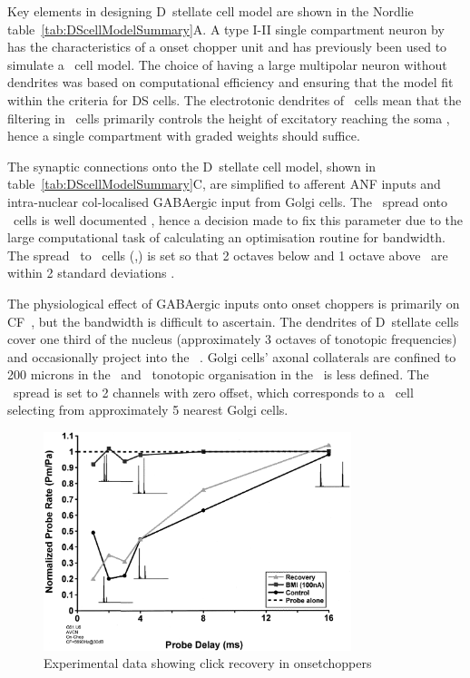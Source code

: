 Key elements in designing D~stellate cell model are shown in the Nordlie table~\ref{tab:DScellModelSummary}A.
A type I-II single compartment neuron by \citet{RothmanManis:2003b} has the characteristics of a onset chopper unit and has previously been used to simulate a \DS~cell model.
The choice of having a large multipolar neuron without dendrites was based on computational efficiency and ensuring that the model fit within the criteria for DS cells.
The electrotonic dendrites of \DS~cells mean that the filtering in \DS~cells primarily controls the height of excitatory {\PSPs} reaching the soma \citep{WhiteYoungEtAl:1994}, hence a single compartment with graded weights should suffice.


The synaptic connections onto the D~stellate cell model, shown in table~\ref{tab:DScellModelSummary}C, are simplified to afferent ANF inputs and intra-nuclear col-localised GABAergic input from Golgi cells.
The \ANF~spread onto \DS~cells is well documented \citep{PaoliniClark:1999,ArnottWallaceEtAl:2004,PalmerWallaceEtAl:2003,JiangPalmerEtAl:1996,PalmerJiangEtAl:1996}, hence a decision made to fix this parameter due to the large computational task of calculating an optimisation routine for \ANFDS bandwidth.
The spread \ANF~to \DS~cells (\sANFDSh,\sANFDSl) is set so that 2 octaves below and 1 octave above \CF~are within 2 standard deviations \citep{PaoliniClark:1999}.


The physiological effect of GABAergic inputs onto onset choppers is primarily on CF~\citep{CasparyHaveyEtAl:1979,PalombiCaspary:1992,CasparyBackoffEtAl:1994,CasparyPalombi:1993,CasparyPalombiEtAl:1993}, but the bandwidth is difficult to ascertain.
The dendrites of D~stellate cells cover one third of the nucleus (approximately 3 octaves of tonotopic frequencies) and occasionally project into the \GCD~\citep{ArnottWallaceEtAl:2004}.
Golgi cells' axonal collaterals are confined to 200 microns in the \GCD~and \ANF~tonotopic organisation in the \GCD~is less defined.
The \GLGDS~spread is set to 2 channels with zero offset, which corresponds to a \DS~cell selecting from approximately 5 nearest Golgi cells.

\begin{figure}[htb]
  \centering
\includegraphics[keepaspectratio,width=0.8\textwidth]{gfx/Backoff+Palombi-Fig3}
\caption{Experimental data showing click recovery in onsetchoppers
\label{fig:BackoffPalombi}}
\end{figure}

